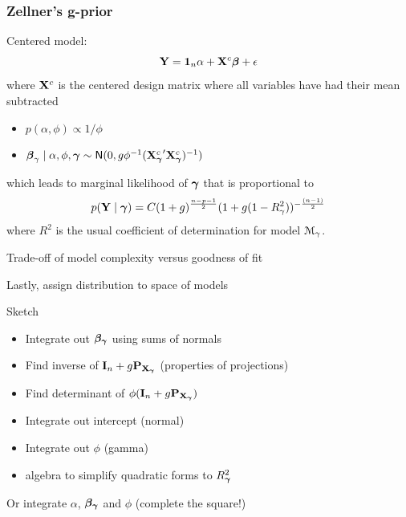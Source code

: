 \documentclass[]{beamer}
\begin{document}
\begin{frame}\frametitle{Zellner's g-prior}
  Centered model:  $$\mathbf{Y} = \mathbf{1}_n \alpha + \mathbf{X}^c \boldsymbol{\beta} + \epsilon$$
  where $\mathbf{X}^c$ is the centered design matrix where all variables have
  had their mean subtracted \pause
\begin{itemize}
\item   $p(\alpha, \phi) \propto 1/\phi$ \pause
\item  $\boldsymbol{\beta}_\gamma \mid \alpha, \phi, \boldsymbol{\gamma} \sim \textsf{N}(0, g \phi^{-1}
  ({\mathbf{X}_{\boldsymbol{\gamma}}^c}^\prime \mathbf{X}_{\boldsymbol{\gamma}}^c)^{-1})$ \pause
\end{itemize}
which leads to marginal likelihood of $\boldsymbol{\gamma}$ that is proportional
to $$ p(\mathbf{Y} \mid \boldsymbol{\gamma}) = C (1 + g)^{\frac{n-p-1}{2}} ( 1 + g (1 -
 R^2_\gamma))^{- \frac{(n-1)}{2}}$$
where $R^2$ is the usual coefficient of determination for model ${\cal M}_\gamma$.
\pause

Trade-off of model complexity versus goodness of fit

\bigskip
Lastly, assign distribution to space of models
\end{frame}

\begin{frame}{Sketch}
\begin{itemize}
  \item  Integrate out $\boldsymbol{\beta_\gamma}$  using sums of normals \pause
  \item  Find inverse of $\mathbf{I}_n + g \mathbf{P}_{\mathbf{X}_{\boldsymbol{\gamma}}}$  (properties of projections) \pause
  \item Find determinant of $\phi (\mathbf{I}_n + g \mathbf{P}_{\mathbf{X}_{\boldsymbol{\gamma}}})$  \pause
  \item Integrate out intercept (normal)  \pause
  \item Integrate out $\phi$  (gamma)  \pause
  \item algebra to simplify quadratic forms to  $R^2_{\boldsymbol{\gamma}}$
\end{itemize}

Or integrate $\alpha$, $\boldsymbol{\beta_\gamma}$ and $\phi$  (complete the square!)
\end{frame}
\end{document}
